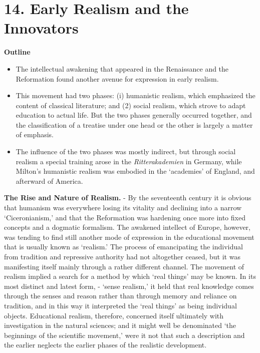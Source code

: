 \documentclass[
]{book}
\providecommand{\tightlist}{%
  \setlength{\itemsep}{0pt}\setlength{\parskip}{0pt}}
\begin{document}
\hypertarget{early-realism-and-the-innovators}{%
\chapter{14. Early Realism and the Innovators}\label{early-realism-and-the-innovators}}

\textbf{Outline}

\begin{itemize}
\tightlist
\item
  The intellectual awakening that appeared in the Renaissance and the Reformation found another avenue for expression in early realism.
\item
  This movement had two phases: (i) humanistic realism, which emphasized the content of classical literature; and (2) social realism, which strove to adapt education to actual life. But the two phases generally occurred together, and the classification of a treatise under one head or the other is largely a matter of emphasis.
\item
  The influence of the two phases was mostly indirect, but through social realism a special training arose in the \emph{Ritterakademien} in Germany, while Milton's humanistic realism was embodied in the `academies' of England, and afterward of America.
\end{itemize}

\textbf{The Rise and Nature of Realism.} - By the seventeenth century it is obvious that humanism was everywhere losing its vitality and declining into a narrow `Ciceronianism,' and that the Reformation was hardening once more into fixed concepts and a dogmatic formalism. The awakened intellect of Europe, however, was tending to find still another mode of expression in the educational movement that is usually known as `realism.' The process of emancipating the individual from tradition and repressive authority had not altogether ceased, but it was manifesting itself mainly through a rather different channel. The movement of realism implied a search for a method by which `real things' may be known. In its most distinct and latest form, - `sense realism,' it held that real knowledge comes through the senses and reason rather than through memory and reliance on tradition, and in this way it interpreted the `real things' as being individual objects. Educational realism, therefore, concerned itself ultimately with investigation in the natural sciences; and it might well be denominated `the beginnings of the scientific movement,' were it not that such a description and the earlier neglects the earlier phases of the realistic development.
\end{document}
